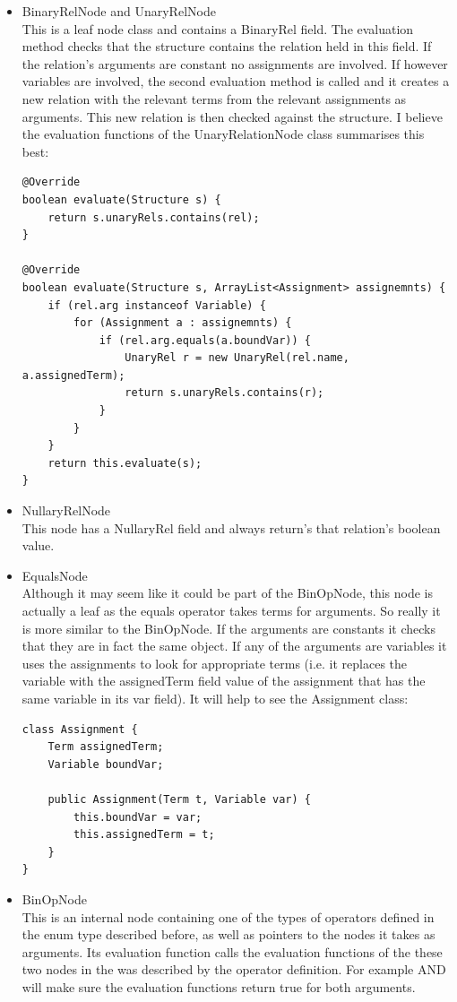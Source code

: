 \documentclass{report}
\begin{document}
\begin{itemize}
\item BinaryRelNode and UnaryRelNode\\
This is a leaf node class and contains a BinaryRel field. The evaluation method 
checks that the structure contains the relation held in this field. If the 
relation's arguments are constant no assignments are involved. If however 
variables are involved, the second evaluation method is called and it creates a 
new relation with the relevant terms from the relevant assignments as arguments. 
This new relation is then checked against the structure. I believe the 
evaluation functions of the UnaryRelationNode class summarises this best:
\begin{verbatim}
@Override
boolean evaluate(Structure s) {
    return s.unaryRels.contains(rel);
}

@Override
boolean evaluate(Structure s, ArrayList<Assignment> assignemnts) {
    if (rel.arg instanceof Variable) {
        for (Assignment a : assignemnts) {
            if (rel.arg.equals(a.boundVar)) {
                UnaryRel r = new UnaryRel(rel.name, a.assignedTerm);
                return s.unaryRels.contains(r);
            }
        }
    }
    return this.evaluate(s);
}
\end{verbatim}

\item NullaryRelNode \\
This node has a NullaryRel field and always return's that relation's boolean 
value.

\item EqualsNode \\
Although it may seem like it could be part of the BinOpNode, this node is 
actually a leaf as the equals operator takes terms for arguments. So really it 
is more similar to the BinOpNode. If the arguments are constants it checks that 
they are in fact the same object. If any of the arguments are variables it uses 
the assignments to look for appropriate terms (i.e. it replaces the variable 
with the assignedTerm field value of the assignment that has the same variable 
in its var field). It will help to see the Assignment class:
\begin{verbatim}
class Assignment {
    Term assignedTerm;
    Variable boundVar;

    public Assignment(Term t, Variable var) {
        this.boundVar = var;
        this.assignedTerm = t;
    }
}
\end{verbatim}

\item BinOpNode \\
This is an internal node containing one of the types of operators defined in the 
enum type described before, as well as pointers to the nodes it takes as 
arguments. Its evaluation function calls the evaluation functions of the these 
two nodes in the was described by the operator definition. For example AND will 
make sure the evaluation functions return true for both arguments.


\end{itemize}
\end{document}
